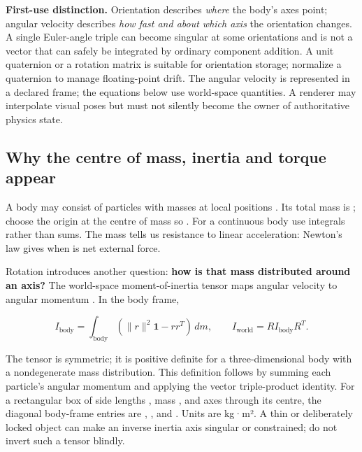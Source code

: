 \textbf{First-use distinction.} Orientation describes \emph{where} the body's axes point; angular velocity describes \emph{how fast and about which axis} the orientation changes. A single Euler-angle triple can become singular at some orientations and is not a vector that can safely be integrated by ordinary component addition. A unit quaternion or a rotation matrix is suitable for orientation storage; normalize a quaternion to manage floating-point drift. The angular velocity is represented in a declared frame; the equations below use world-space quantities. A renderer may interpolate visual poses but must not silently become the owner of authoritative physics state.

\subsection{Why the centre of mass, inertia and torque appear}\label{02-foundations-ii-ch039-why-the-centre-of-mass-inertia-and-torque-appear}

\hypertarget{02-foundations-ii-ch039-why-the-centre-of-mass-inertia-and-torque-appear}{}

A body may consist of particles with masses  at local positions . Its total mass is ; choose the origin at the centre of mass so . For a continuous body use integrals rather than sums. The mass tells us resistance to linear acceleration: Newton's law gives  when  is net external force.

Rotation introduces another question: \textbf{how is that mass distributed around an axis?} The world-space moment-of-inertia tensor  maps angular velocity to angular momentum . In the body frame,

\[
I_{\mathrm{body}}=\int_{\mathrm{body}}(\|r\|^2\mathbf{1}-rr^T)\,dm,
\qquad I_{\mathrm{world}}=R I_{\mathrm{body}}R^T.
\]

The tensor is symmetric; it is positive definite for a three-dimensional body with a nondegenerate mass distribution. This definition follows by summing each particle's angular momentum  and applying the vector triple-product identity. For a rectangular box of side lengths , mass , and axes through its centre, the diagonal body-frame entries are , , and . Units are kg·m². A thin or deliberately locked object can make an inverse inertia axis singular or constrained; do not invert such a tensor blindly.

